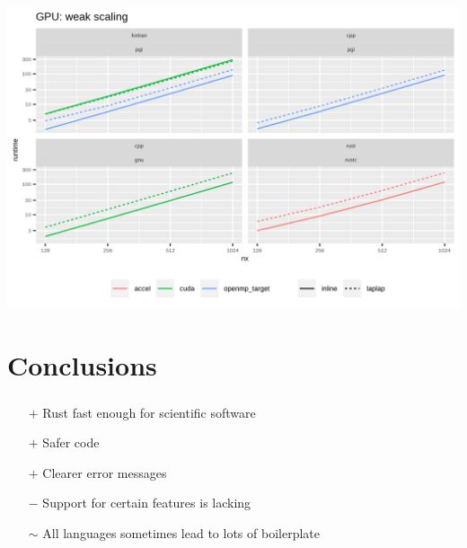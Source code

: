 \documentclass[aspectratio=43, t]{beamer}
\begin{document}
\begin{frame}
	\centering
	\includegraphics[width = \textwidth, height = \textheight, keepaspectratio]{weak_scaling_gpu}
	\par
\end{frame}

\section*{Conclusions}
\begin{frame}
	\frametitle{\secname}
	\begin{itemize}
		\item[$+$] Rust fast enough for scientific software
		\item[$+$]    Safer code
		\item[$+$]    Clearer error messages
		\item[$-$]    Support for certain features is lacking
		\item[$\sim$] All languages sometimes lead to lots of boilerplate
	\end{itemize}

\end{frame}
\end{document}
